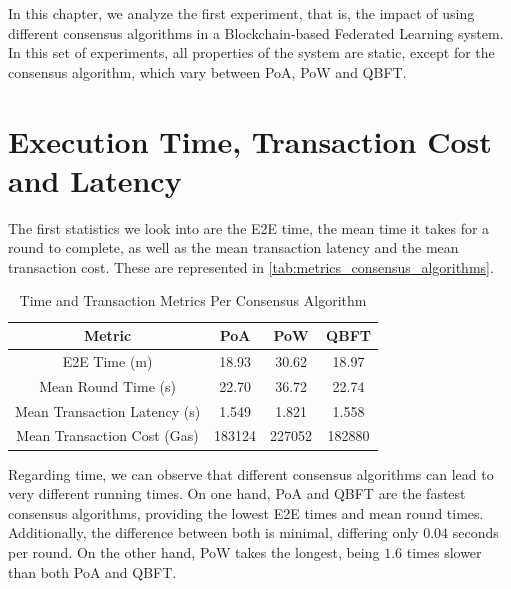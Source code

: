 In this chapter, we analyze the first experiment, that is, the impact of using different consensus algorithms in a Blockchain-based Federated Learning system. In this set of experiments, all properties of the system are static, except for the consensus algorithm, which vary between PoA, PoW and QBFT.

\section{Execution Time, Transaction Cost and Latency}

The first statistics we look into are the E2E time, the mean time it takes for a round to complete, as well as the mean transaction latency and the mean transaction cost. These are represented in \autoref{tab:metrics_consensus_algorithms}.

\begin{table}[!ht]
\centering
\begin{tabular}{c|c|c|c} \hline \hline
Metric                              & PoA    & PoW    & QBFT   \\ \hline \hline
E2E Time (m)            & 18.93  & 30.62  & 18.97  \\ \hline
Mean Round Time (s)             & 22.70  & 36.72  & 22.74  \\ \hline
Mean Transaction Latency (s)    & 1.549  & 1.821  & 1.558  \\ \hline
Mean Transaction Cost (Gas)     & 183124 & 227052 & 182880 \\ \hline
\end{tabular}
\caption{Time and Transaction Metrics Per Consensus Algorithm}
\label{tab:metrics_consensus_algorithms}
\end{table}

Regarding time, we can observe that different consensus algorithms can lead to very different running times. On one hand, PoA and QBFT are the fastest consensus algorithms, providing the lowest E2E times and mean round times. Additionally, the difference between both is minimal, differing only $0.04$ seconds per round. On the other hand, PoW takes the longest, being $1.6$ times slower than both PoA and QBFT.

